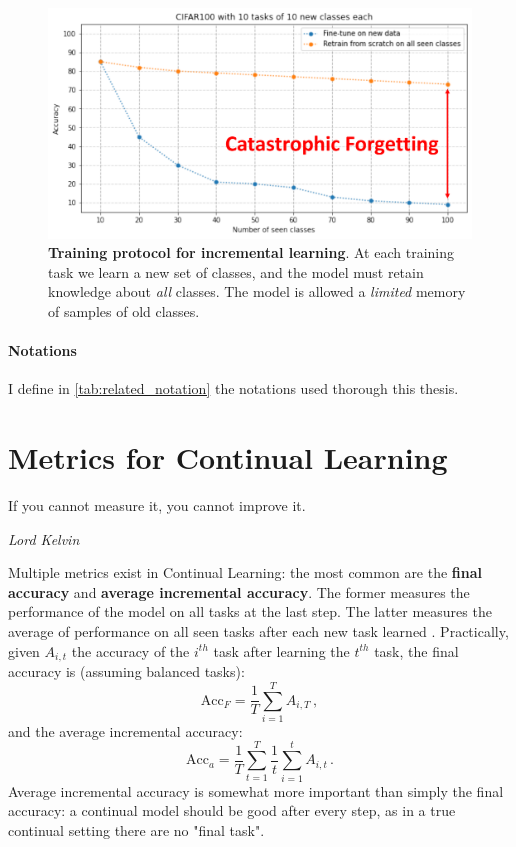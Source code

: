 \begin{figure}[tb]
    \begin{center}
        \includegraphics[width=0.8\linewidth]{images/related/catastrophic_forgetting.pdf}
    \end{center}
    \caption{\textbf{Training protocol for incremental learning}. At each training task we learn a
        new set of classes, and the model must retain knowledge about \textit{all} classes. The
        model is allowed a \textit{limited} memory of samples of old classes.}
    \label{fig:related_forgetting}
\end{figure}

\paragraph{Notations} I define in \autoref{tab:related_notation} the notations used thorough this thesis.



\section{Metrics for Continual Learning}

\epigraph{If you cannot measure it, you cannot improve it.}{\textit{Lord Kelvin}}

Multiple metrics exist in Continual Learning: the most common are the \textbf{final accuracy} and
\textbf{average incremental accuracy}. The former measures the performance of the model on all tasks
at the last step. The latter measures the average of performance on all seen tasks after each new
task learned \citep{rebuffi2017icarl}. Practically, given $A_{i,t}$ the accuracy of the $i^{th}$
task after
learning the $t^{th}$ task, the final accuracy is (assuming balanced tasks):
%
\begin{equation}
    \text{Acc}_F = \frac{1}{T} \sum_{i=1}^T A_{i,T}\,,
    \label{eq:related_final_acc}
\end{equation}
%
and the average incremental accuracy:
%
\begin{equation}
    \text{Acc}_a = \frac{1}{T} \sum_{t=1}^T \frac{1}{t}  \sum_{i=1}^t A_{i,t}\,.
    \label{eq:related_avg_acc}
\end{equation}
%
Average incremental accuracy is somewhat more important than simply the final accuracy: a continual
model should be good after every step, as in a true continual setting there are no "final task".

